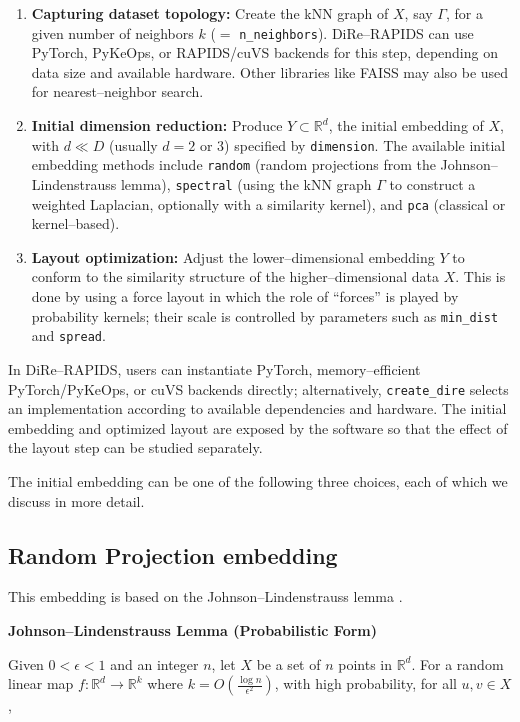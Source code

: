 \documentclass[11pt]{article}
\begin{document}
\begin{enumerate}
    \item \textbf{Capturing dataset topology:} Create the kNN graph of $X$, say $\Gamma$, for a given number of neighbors $k$ ($=$ \texttt{n\_neighbors}). DiRe--RAPIDS can use PyTorch, PyKeOps, or RAPIDS/cuVS backends for this step, depending on data size and available hardware. Other libraries like FAISS \cite{faiss} may also be used for nearest--neighbor search.
    \item \textbf{Initial dimension reduction:} Produce $Y \subset \mathbb{R}^d$, the initial embedding of $X$, with $d \ll D$ (usually $d=2$ or $3$) specified by \texttt{dimension}. The available initial embedding methods include \texttt{random} (random projections from the Johnson--Lindenstrauss lemma), \texttt{spectral} (using the kNN graph $\Gamma$ to construct a weighted Laplacian, optionally with a similarity kernel), and \texttt{pca} (classical or kernel--based).
    \item \textbf{Layout optimization:} Adjust the lower--dimensional embedding $Y$ to conform to the similarity structure of the higher--dimensional data $X$. This is done by using a force layout in which the role of ``forces'' is played by probability kernels; their scale is controlled by parameters such as \texttt{min\_dist} and \texttt{spread}.
\end{enumerate}

In DiRe--RAPIDS, users can instantiate PyTorch, memory--efficient PyTorch/PyKeOps, or cuVS backends directly; alternatively, \texttt{create\_dire} selects an implementation according to available dependencies and hardware. The initial embedding and optimized layout are exposed by the software so that the effect of the layout step can be studied separately.

The initial embedding can be one of the following three choices, each of which we discuss in more detail.

\subsection{Random Projection embedding} This embedding is based on the Johnson--Lindenstrauss lemma \cite{JL}.

\medskip

\textbf{Johnson--Lindenstrauss Lemma (Probabilistic Form)}

Given \(0 < \epsilon < 1\) and an integer \(n\), let \(X\) be a set of \(n\) points in \(\mathbb{R}^d\). For a random linear map \(f: \mathbb{R}^d \to \mathbb{R}^k\) where \(k = O\left(\frac{\log n}{\epsilon^2}\right)\), with high probability, for all \(u, v \in X\),
\end{document}
